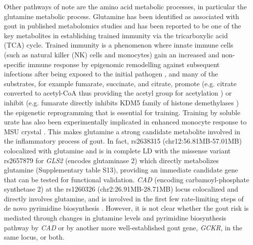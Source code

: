 \documentclass[gucdd,article,submit,pdftex,moreauthors]{Definitions/mdpi}
\begin{document}
Other pathways of note are the amino acid metabolic processes, in particular the glutamine metabolic process.
Glutamine has been identified as associated with gout in published metabolomics studies \citep{renaudin_gout_2020,joshi_prediagnostic_2023} and has been reported to be one of the key metabolites in establishing trained immunity via the tricarboxylic acid (TCA) cycle.
Trained immunity is a phenomenon where innate immune cells (such as natural killer (NK) cells and monocytes) gain an increased and non-spec\-ific immune response by epigenomic remodelling against subsequent infections after being exposed to the initial pathogen \citep{netea_trained_2011,arts_glutaminolysis_2016}, and many of the substrates, for example fumarate, succinate, and citrate, promote (e.g. citrate converted to acetyl-CoA thus providing the acetyl group for acetylation \citep{van_der_heijden_epigenetics_2018}) or inhibit (e.g. fumarate directly inhibits KDM5 family of histone demethylases \citep{arts_immunometabolic_2016,xiao_inhibition_2012}) the epigenetic reprogramming that is essential for training.
Training by soluble urate has also been experimentally implicated in enhanced monocyte response to MSU crystal \citep{straton_epigenomic_2024}.
This makes glutamine a strong candidate metabolite involved in the inflammatory process of gout.
In fact, rs2638315 (chr12:56.81MB-57.01MB) colocalized with glutamine and is in complete LD with the missense variant rs2657879 for \textit {GLS2} \citep{major_genome-wide_2024} (encodes glutaminase 2) which directly metabolizes glutamine (Supplementary table S13), providing an immediate candidate gene that can be tested for functional validation.
\textit{CAD} (encoding carbamoyl-phosphate synthetase 2) at the rs1260326 (chr2:26.91MB-28.71MB) locus colocalized and directly involves glutamine, and is involved in the first few rate-limiting steps of de novo pyrimidine biosynthesis \citep{li_pyrimidine_2021}.
However, it is not clear whether the gout risk is mediated through changes in glutamine levels and pyrimidine biosynthesis pathway by \textit{CAD} or by another more well-established gout gene, \textit{GCKR}, in the same locus, or both.
\end{document}
